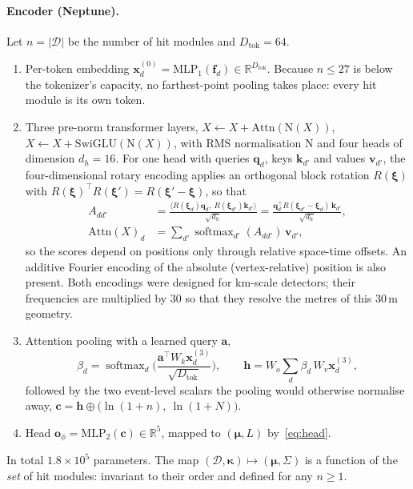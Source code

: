 \documentclass[11pt]{article}
\theoremstyle{definition}
\newcommand{\D}{\mathcal{D}}
\newcommand{\R}{\mathbb{R}}
\begin{document}
\paragraph{Encoder (Neptune).}
Let $n=|\D|$ be the number of hit modules and $D_{\mathrm{tok}}=64$.
\begin{enumerate}
  \item Per-token embedding $\bm x^{(0)}_d = \mathrm{MLP}_1(\bm f_d)\in\R^{D_{\mathrm{tok}}}$. Because $n\le27$ is
        below the tokenizer's capacity, no farthest-point pooling takes place: every hit module is its own token.
  \item Three pre-norm transformer layers, $X\leftarrow X+\mathrm{Attn}(\mathrm{N}(X))$,
        $X\leftarrow X+\mathrm{SwiGLU}(\mathrm{N}(X))$, with RMS normalisation $\mathrm N$ and four heads of
        dimension $d_h=16$. For one head with queries $\bm q_d$, keys $\bm k_{d'}$ and values $\bm v_{d'}$, the
        four-dimensional rotary encoding applies an orthogonal block rotation $R(\bm\xi)$ with
        $R(\bm\xi)^\top R(\bm\xi')=R(\bm\xi'-\bm\xi)$, so that
        \begin{align}
          A_{dd'} &= \frac{\big\langle R(\bm\xi_d)\bm q_d,\ R(\bm\xi_{d'})\bm k_{d'}\big\rangle}{\sqrt{d_h}}
                  = \frac{\bm q_d^\top R(\bm\xi_{d'}-\bm\xi_d)\,\bm k_{d'}}{\sqrt{d_h}},\\
          \mathrm{Attn}(X)_d &= \sum_{d'}\operatorname{softmax}_{d'}(A_{dd'})\,\bm v_{d'} ,
        \end{align}
        so the scores depend on positions only through relative space-time offsets. An additive Fourier encoding
        of the absolute (vertex-relative) position is also present. Both encodings were designed for km-scale
        detectors; their frequencies are multiplied by 30 so that they resolve the metres of this 30\,m geometry.
  \item Attention pooling with a learned query $\bm a$,
        \begin{equation}
          \beta_d = \operatorname{softmax}_{d}\Big(\frac{\bm a^\top W_k\bm x^{(3)}_d}{\sqrt{D_{\mathrm{tok}}}}\Big),\qquad
          \bm h = W_o\sum_{d}\beta_d\,W_v\bm x^{(3)}_d ,
        \end{equation}
        followed by the two event-level scalars the pooling would otherwise normalise away,
        $\bm c = \bm h \oplus \big(\ln(1+n),\ \ln(1+N)\big)$.
  \item Head $\bm o_\phi = \mathrm{MLP}_2(\bm c)\in\R^5$, mapped to $(\bm\mu,L)$ by~\eqref{eq:head}.
\end{enumerate}
In total $1.8\times10^5$ parameters. The map $(\D,\bm\kappa)\mapsto(\bm\mu,\Sigma)$ is a function of the
\emph{set} of hit modules: invariant to their order and defined for any $n\ge1$.
\end{document}
